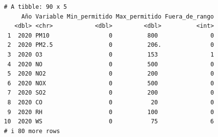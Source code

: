 \documentclass[
  letterpaper,
  DIV=11,
  numbers=noendperiod]{scrartcl}
\begin{document}
\begin{verbatim}
# A tibble: 90 x 5
     Año Variable Min_permitido Max_permitido Fuera_de_rango
   <dbl> <chr>            <dbl>         <dbl>          <int>
 1  2020 PM10                 0          800               0
 2  2020 PM2.5                0          206.              0
 3  2020 O3                   0          153               1
 4  2020 NO                   0          500               0
 5  2020 NO2                  0          200               0
 6  2020 NOX                  0          500               0
 7  2020 SO2                  0          200               0
 8  2020 CO                   0           20               0
 9  2020 RH                   0          100               0
10  2020 WS                   0           75               6
# i 80 more rows
\end{verbatim}
\end{document}
